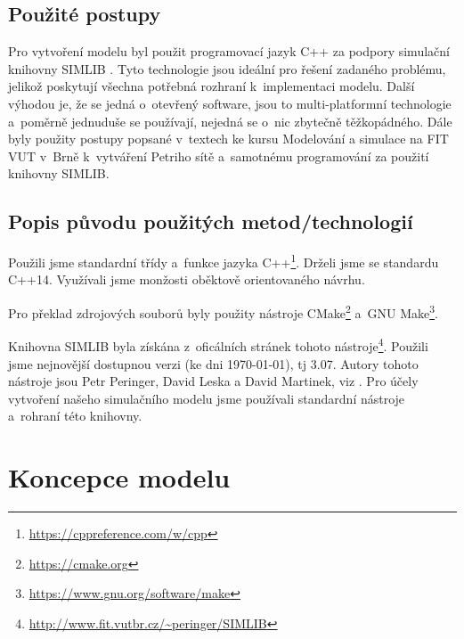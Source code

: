 \documentclass[a4paper, 11pt]{article}
\begin{document}
	\subsection{Použité postupy}

	Pro vytvoření modelu byl použit programovací jazyk C++ za podpory
	simulační knihovny SIMLIB \cite{SIMLIB}. Tyto technologie jsou ideální pro
	řešení zadaného problému, jelikož poskytují všechna potřebná rozhraní
	k~implementaci modelu. Další výhodou je, že se jedná o~otevřený software,
	jsou to multi-platformní technologie a~poměrně jednuduše se používají,
	nejedná se o~nic zbytečně těžkopádného. Dále byly použity postupy popsané
	v~textech ke kursu Modelování a simulace na FIT VUT v~Brně \cite{IMS_slides}
	k~vytváření Petriho sítě \cite[snímek 123]{IMS_slides} a~samotnému
	programování za použití knihovny SIMLIB.


	\subsection{Popis původu použitých metod/technologií}

	Použili jsme standardní třídy a~funkce jazyka
	C++\footnote{\url{https://cppreference.com/w/cpp}}.
	Drželi jsme se standardu C++14. Využívali jsme monžosti oběktově
	orientovaného návrhu.

	Pro překlad zdrojových souborů byly použity nástroje
	CMake\footnote{\url{https://cmake.org}}
	a~GNU Make\footnote{\url{https://www.gnu.org/software/make}}.

	Knihovna SIMLIB byla získána z~oficálních stránek tohoto
	nástroje\footnote{\url{http://www.fit.vutbr.cz/~peringer/SIMLIB}}.
	Použili jsme nejnovější dostupnou verzi (ke dni \today), tj 3.07.
	Autory tohoto nástroje jsou Petr Peringer, David Leska a David Martinek,
	viz \cite{SIMLIB}. Pro účely vytvoření našeho simulačního modelu
	\cite[snímek 44]{IMS_slides} jsme používali standardní nástroje
	a~rohraní této knihovny.



	\section{Koncepce modelu}
\end{document}
